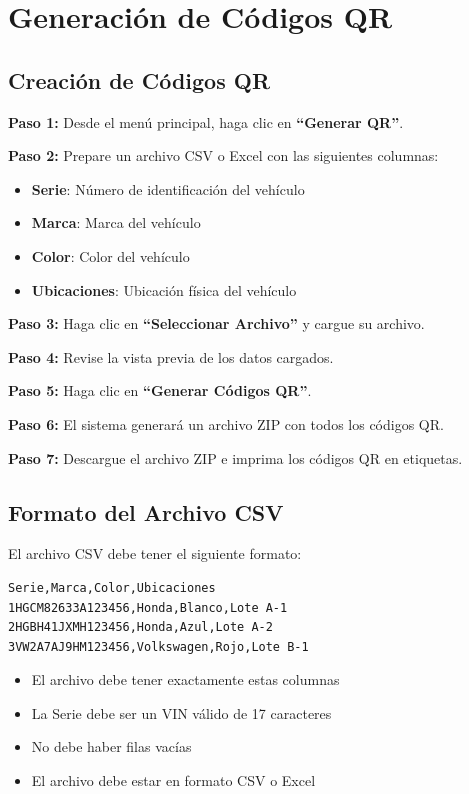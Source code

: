 \documentclass[11pt,a4paper]{article}
\newcommand{\step}[1]{\textbf{\color{primarytext}Paso #1:}}
\newcommand{\button}[1]{\textbf{#1}}
\begin{document}
\section{Generación de Códigos QR}

\subsection{Creación de Códigos QR}

\step{1} Desde el menú principal, haga clic en \button{``Generar QR''}.

\step{2} Prepare un archivo CSV o Excel con las siguientes columnas:
\begin{itemize}
    \item \textbf{Serie}: Número de identificación del vehículo
    \item \textbf{Marca}: Marca del vehículo
    \item \textbf{Color}: Color del vehículo
    \item \textbf{Ubicaciones}: Ubicación física del vehículo
\end{itemize}

\step{3} Haga clic en \button{``Seleccionar Archivo''} y cargue su archivo.

\step{4} Revise la vista previa de los datos cargados.

\step{5} Haga clic en \button{``Generar Códigos QR''}.

\step{6} El sistema generará un archivo ZIP con todos los códigos QR.

\step{7} Descargue el archivo ZIP e imprima los códigos QR en etiquetas.

\subsection{Formato del Archivo CSV}

El archivo CSV debe tener el siguiente formato:

\begin{verbatim}
Serie,Marca,Color,Ubicaciones
1HGCM82633A123456,Honda,Blanco,Lote A-1
2HGBH41JXMH123456,Honda,Azul,Lote A-2
3VW2A7AJ9HM123456,Volkswagen,Rojo,Lote B-1
\end{verbatim}

\begin{warningbox}
\begin{itemize}
    \item El archivo debe tener exactamente estas columnas
    \item La Serie debe ser un VIN válido de 17 caracteres
    \item No debe haber filas vacías
    \item El archivo debe estar en formato CSV o Excel
\end{itemize}
\end{warningbox}
\end{document}
